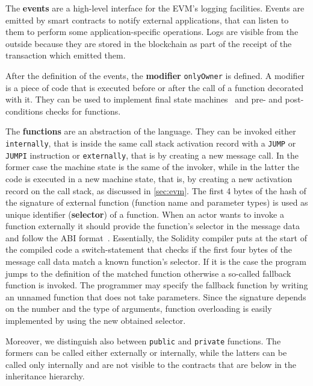 The \textbf{events} are a high-level interface for the EVM's logging
facilities. Events are emitted by smart contracts to notify external
applications, that can listen to them to perform some application-specific
operations. Logs are visible from the outside because they are stored
in the blockchain as part of the receipt of the transaction which emitted them.

After the definition of the events, the \textbf{modifier} \verb|onlyOwner| is
defined. A modifier is a piece of code that is executed before or after the
call of a function decorated with it. They can be used to implement final
state machines~\cite{bib:solidity-docs} and pre- and post-conditions checks for
functions.

The \textbf{functions} are an abstraction of the language. They can be invoked
either \texttt{internally}, that is inside the same call stack activation record
with a \texttt{JUMP} or \texttt{JUMPI} instruction or \texttt{externally}, that
is by creating a new message call. In the former case the machine state is the
same of the invoker, while in the latter the code is executed in a new machine
state, that is, by creating a new activation record on the call stack, as
discussed in \autoref{sec:evm}. The first 4 bytes of the hash of the signature
of external function (function name and parameter types) is used as unique
identifier (\textbf{selector}) of a function. When an actor wants to invoke a
function externally it should provide the function's selector in the message
data and follow the ABI format~\cite{bib:solidity-docs}. Essentially, the
Solidity compiler puts at the start of the compiled code a switch-statement that
checks if the first four bytes of the message call data match a known function's
selector. If it is the case the program jumps to the definition of the matched
function otherwise a so-called fallback function is invoked. The programmer may
specify the fallback function by writing an unnamed function that does not take
parameters. Since the signature depends on the number and the type of arguments,
function overloading is easily implemented by using the new obtained selector.

Moreover, we distinguish also between \texttt{public} and \texttt{private}
functions. The formers can be called either externally or internally, while the
latters can be called only internally and are not visible to the contracts that
are below in the inheritance hierarchy.

